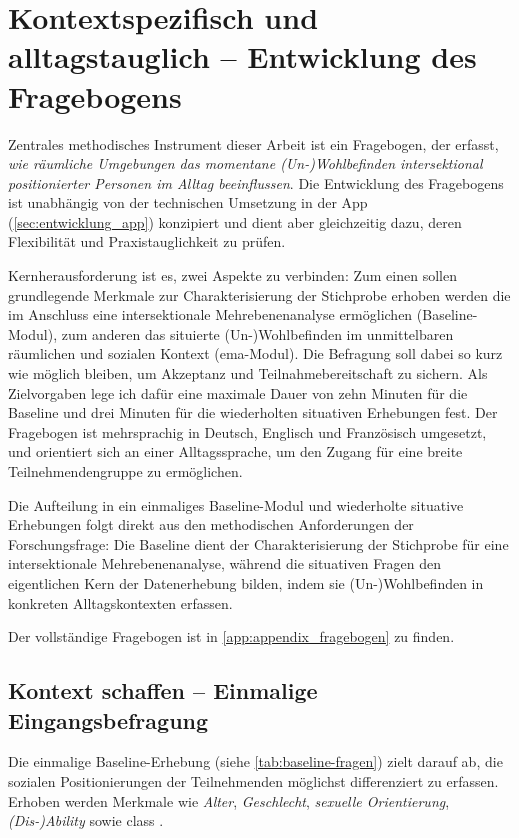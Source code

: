 \chapter{Kontextspezifisch und alltagstauglich -- Entwicklung des Fragebogens}
\label{sec:fragebogenentwicklung}

Zentrales methodisches Instrument dieser Arbeit ist ein Fragebogen, der erfasst, \emph{wie räumliche Umgebungen das momentane (Un\nobreakdash-)Wohl\-be\-find\-en intersektional positionierter Personen im Alltag beeinflussen}. Die Entwicklung des Fragebogens ist unabhängig von der technischen Umsetzung in der App (\cref{sec:entwicklung_app}) konzipiert und dient aber gleichzeitig dazu, deren Flexibilität und Praxistauglichkeit zu prüfen.

Kernherausforderung ist es, zwei Aspekte zu verbinden: Zum einen sollen grundlegende Merkmale zur Charakterisierung der Stichprobe erhoben werden die im Anschluss eine intersektionale Mehrebenenanalyse ermöglichen (Baseline-Modul), zum anderen das situierte (Un\nobreakdash-)Wohl\-be\-find\-en im unmittelbaren räumlichen und sozialen Kontext (\gls{ema}-Modul). Die Befragung soll dabei so kurz wie möglich bleiben, um Akzeptanz und Teilnahmebereitschaft zu sichern. Als Zielvorgaben lege ich dafür eine maximale Dauer von zehn Minuten für die Baseline und drei Minuten für die wiederholten situativen Erhebungen fest. Der Fragebogen ist mehrsprachig in Deutsch, Englisch und Französisch umgesetzt, und orientiert sich an einer Alltagssprache, um den Zugang für eine breite Teilnehmendengruppe zu ermöglichen. 

Die Aufteilung in ein einmaliges Baseline-Modul und wiederholte situative Erhebungen folgt direkt aus den methodischen Anforderungen der Forschungsfrage: Die Baseline dient der Charakterisierung der Stichprobe für eine intersektionale Mehrebenenanalyse, während die situativen Fragen den eigentlichen Kern der Datenerhebung bilden, indem sie (Un\nobreakdash-)Wohl\-be\-find\-en in konkreten Alltagskontexten erfassen.

Der vollständige Fragebogen ist in \cref{app:appendix_fragebogen} zu finden.

\section{Kontext schaffen -- Einmalige Eingangsbefragung}

Die einmalige Baseline-Erhebung (siehe \cref{tab:baseline-fragen}) zielt darauf ab, die sozialen Positionierungen der Teilnehmenden möglichst differenziert zu erfassen. Erhoben werden Merkmale wie \emph{Alter}, \emph{Geschlecht}, \emph{sexuelle Orientierung}, \emph{(Dis-)Ability}
sowie \gls{class} \parencite{bauerIntersectionalityQuantitativeResearch2021}.


